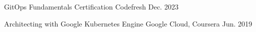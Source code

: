 

\begin{cvhonors}

\cvhonor
  {GitOps Fundamentals Certification} %
  {Codefresh} %
  {} %
  {Dec. 2023} %

\cvhonor
  {Architecting with Google Kubernetes Engine} %
  {Google Cloud, Coursera} %
  {} %
  {Jun. 2019} %


\end{cvhonors}
